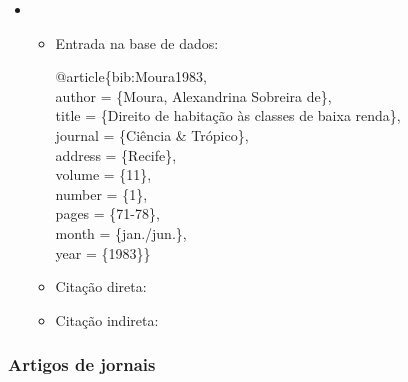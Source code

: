 \documentclass[a4paper,12pt,oneside,onecolumn]{uerj/uerj}
\newcommand{\formato}[1]{\begin{flushleft}{#1}\end{flushleft}}
\begin{document}
\begin{itemize}[label={Ex.:},leftmargin=\parindent,parsep=0pt,itemsep=0pt]
  \item \formato{\citetext{bib:Moura1983}}

  \begin{itemize}[leftmargin=*,parsep=0pt,itemsep=0pt]
    \item Entrada na base de dados:

    \formato{
      @article\{bib:Moura1983,\\
        author = \{Moura, Alexandrina Sobreira de\},\\
        title = \{Direito de habita{\c c}{\~a}o {\`a}s classes de baixa renda\},\\
        journal = \{Ci{\^e}ncia \& Tr{\'o}pico\},\\
        address = \{Recife\},\\
        volume = \{11\},\\
        number = \{1\},\\
        pages = \{71-78\},\\
        month = \{jan./jun.\},\\
        year = \{1983\}\}\\
    }

    \item Citação direta: 
    \item Citação indireta: \cite{bib:Moura1983}
  \end{itemize}
\end{itemize}

\subsubsection{Artigos de jornais}
\end{document}
